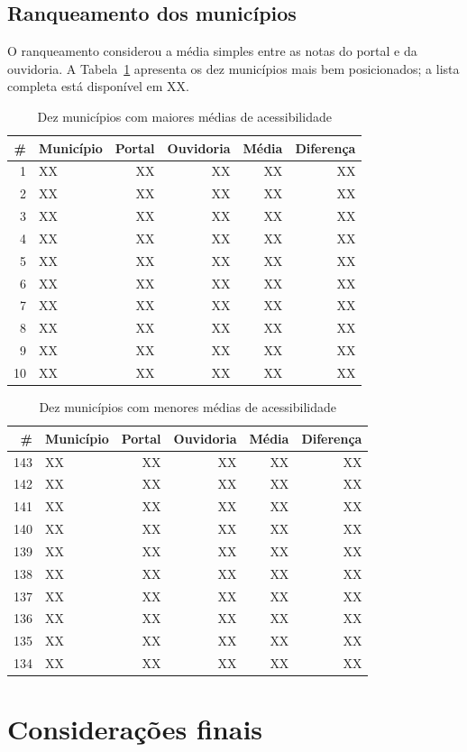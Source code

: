 \documentclass[12pt]{article}
\begin{document}
\subsection{Ranqueamento dos municípios}


O ranqueamento considerou a média simples entre as notas do portal e da
ouvidoria. A Tabela~\ref{tab:ranking} apresenta os dez municípios mais bem
posicionados; a lista completa está disponível em XX. %
 
\begin{table}[ht]
\centering
\caption{Dez municípios com maiores médias de acessibilidade}
\label{tab:ranking}
\begin{tabular}{rlrrrr}
\toprule
\textbf{\#} & \textbf{Município} & \textbf{Portal} & \textbf{Ouvidoria} & \textbf{Média} & \textbf{Diferença} \\
\midrule
1  & XX & XX & XX & XX & XX \\
2  & XX & XX & XX & XX & XX \\
3  & XX & XX & XX & XX & XX \\
4  & XX & XX & XX & XX & XX \\
5  & XX & XX & XX & XX & XX \\
6  & XX & XX & XX & XX & XX \\
7  & XX & XX & XX & XX & XX \\
8  & XX & XX & XX & XX & XX \\
9  & XX & XX & XX & XX & XX \\
10 & XX & XX & XX & XX & XX \\
\bottomrule
\end{tabular}
\end{table}



\begin{table}[H]
\centering
\caption{Dez municípios com menores médias de acessibilidade}
\label{tab:ranking_ultimos}
\begin{tabular}{rlrrrr}
\toprule
\textbf{\#} & \textbf{Município} & \textbf{Portal} & \textbf{Ouvidoria} & \textbf{Média} & \textbf{Diferença} \\
\midrule
143  & XX & XX & XX & XX & XX \\
142  & XX & XX & XX & XX & XX \\
141  & XX & XX & XX & XX & XX \\
140  & XX & XX & XX & XX & XX \\
139  & XX & XX & XX & XX & XX \\
138  & XX & XX & XX & XX & XX \\
137  & XX & XX & XX & XX & XX \\
136  & XX & XX & XX & XX & XX \\
135  & XX & XX & XX & XX & XX \\
134 & XX & XX & XX & XX & XX \\
\bottomrule
\end{tabular}
\end{table}

\section{Considerações finais}



\end{document}
